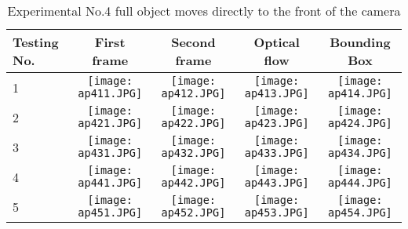 \begin{table}[h]
	\begin{adjustwidth}{-1.2in}{-1.2in}%
		\begin{tabular}{|p{1.1cm}|c|c|c|c|}
			\hline
			Testing No. & First frame & Second frame & Optical flow & Bounding Box \\ \hline
			1 & 
			\texttt{[image: ap411.JPG]} & \texttt{[image: ap412.JPG]} & \texttt{[image: ap413.JPG]} & \texttt{[image: ap414.JPG]} \\
			2 & 
			\texttt{[image: ap421.JPG]} & \texttt{[image: ap422.JPG]} & \texttt{[image: ap423.JPG]} & \texttt{[image: ap424.JPG]} \\
			3 & 
			\texttt{[image: ap431.JPG]} & \texttt{[image: ap432.JPG]} & \texttt{[image: ap433.JPG]} & \texttt{[image: ap434.JPG]} \\
			4 & 
			\texttt{[image: ap441.JPG]} & \texttt{[image: ap442.JPG]} & \texttt{[image: ap443.JPG]} & \texttt{[image: ap444.JPG]} \\
			5 & 
			\texttt{[image: ap451.JPG]} & \texttt{[image: ap452.JPG]} & \texttt{[image: ap453.JPG]} & \texttt{[image: ap454.JPG]} \\
			\hline
		\end{tabular}
		\caption{Experimental No.4 full object moves directly to the front of the camera}
		\label{tab:04}
	\end{adjustwidth}
\end{table}

